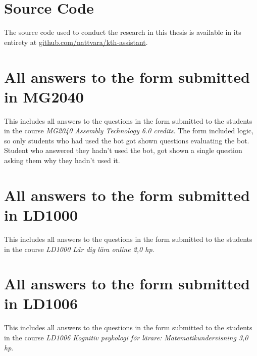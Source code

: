 ﻿\chapter{Source Code}
\label{appendix:source_code}


The source code used to conduct the research in this thesis is available in its entirety at \href{https://github.com/nattvara/kth-assistant}{github.com/nattvara/kth-assistant}.


\chapter{All answers to the form submitted in MG2040}
\label{appendix:mg2040_form}


This includes all answers to the questions in the form submitted to the students in the course \textit{MG2040 Assembly Technology 6.0 credits}. The form included logic, so only students who had used the bot got shown questions evaluating the bot. Student who answered they hadn’t used the bot, got shown a single question asking them why they hadn’t used it.





\chapter{All answers to the form submitted in LD1000}
\label{appendix:ld1000_form}


This includes all answers to the questions in the form submitted to the students in the course \textit{LD1000 Lär dig lära online 2,0 hp}.





\chapter{All answers to the form submitted in LD1006}
\label{appendix:ld1000_form}


This includes all answers to the questions in the form submitted to the students in the course \textit{LD1006 Kognitiv psykologi för lärare: Matematikundervisning 3,0 hp}.





\cleardoublepage
